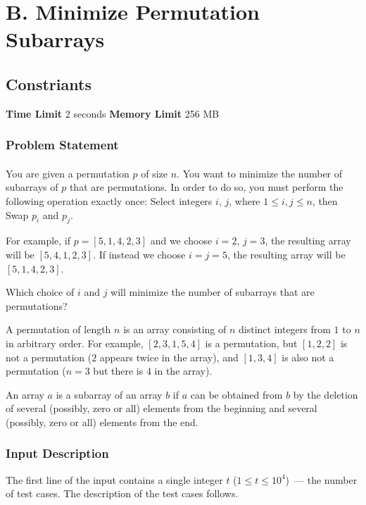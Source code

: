 \documentclass{article}
\begin{document}
\section*{B. Minimize Permutation Subarrays}
\subsection*{Constriants}
\textbf{Time Limit}
2 seconds
\hfill
\textbf{Memory Limit}
256 MB
\subsubsection*{Problem Statement}
\paragraph{}You are given a permutation $p$ of size $n$. You want to minimize the number of subarrays of $p$ that are permutations. In order to do so, you must perform the following operation exactly once:  Select integers $i$, $j$, where $1 \le i, j \le n$, then  Swap $p_i$ and $p_j$. 

For example, if $p = [5, 1, 4, 2, 3]$ and we choose $i = 2$, $j = 3$, the resulting array will be $[5, 4, 1, 2, 3]$. If instead we choose $i = j = 5$, the resulting array will be $[5, 1, 4, 2, 3]$.

Which choice of $i$ and $j$ will minimize the number of subarrays that are permutations?

A permutation of length $n$ is an array consisting of $n$ distinct integers from $1$ to $n$ in arbitrary order. For example, $[2,3,1,5,4]$ is a permutation, but $[1,2,2]$ is not a permutation ($2$ appears twice in the array), and $[1,3,4]$ is also not a permutation ($n=3$ but there is $4$ in the array).

An array $a$ is a subarray of an array $b$ if $a$ can be obtained from $b$ by the deletion of several (possibly, zero or all) elements from the beginning and several (possibly, zero or all) elements from the end.
\paragraph{}
\subsubsection*{Input Description}The first line of the input contains a single integer $t$ ($1 \le t \le 10^4$) — the number of test cases. The description of the test cases follows.
\end{document}
